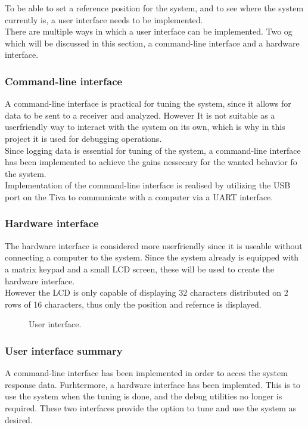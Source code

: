 \documentclass[../../../main]{subfiles}
\begin{document}
To be able to set a reference position for the system, and to see where the system currently is, a user interface needs to be implemented.\\
There are multiple ways in which a user interface can be implemented.
Two og which will be discussed in this section, a command-line interface and a hardware interface.

\subsubsection{Command-line interface}%
\label{ssub:command-line_interface}
A command-line interface is practical for tuning the system, since it allows for data to be sent to a receiver and analyzed.
However It is not suitable as a userfriendly way to interact with the system on its own, which is why in this project it is used for debugging operations.
\\
Since logging data is essential for tuning of the system, a command-line interface has been implemented to achieve the gains nessecary for the wanted behavior fo the system.
\\
Implementation of the command-line interface is realised by utilizing the USB port on the Tiva to communicate with a computer via a UART interface.

\subsubsection{Hardware interface}%
\label{ssub:hardware_interface}
The hardware interface is considered more userfriendly since it is useable without connecting a computer to the system.
Since the system already is equipped with a matrix keypad and a small LCD screen, these will be used to create the hardware interface.
\\
However the LCD is only capable of displaying $32$ characters distributed on $2$ rows of 16 characters, thus only the position and refernce is displayed.

\begin{figure}[H]
  \centering
  \def\svgwidth{\textwidth}
  
  \caption{User interface.}
  \label{fig:User_interface}
\end{figure}

\subsubsection{User interface summary}%
\label{ssub:user_interface_summary}

A command-line interface has been implemented in order to acces the system response data.
Furhtermore, a hardware interface has been implemted. This is to use the system when the tuning is done, and the debug utilities no longer is required.
These two interfaces provide the option to tune and use the system as desired.
\end{document}
